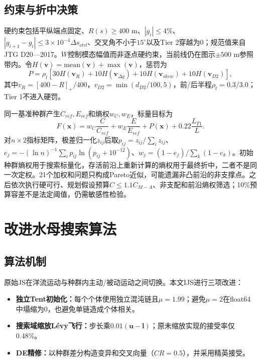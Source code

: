 \documentclass[preprint,12pt]{elsarticle}
\begin{document}
\subsection{约束与折中决策}

硬约束包括平纵端点固定、$R(s)\geq400$ m、$|g_i|\leq4\%$、$|g_{i+1}-g_i|\leq3\times10^{-4}\Delta s_{ctrl}$、交叉角不小于$15^\circ$以及Tier 2穿越为0；规范值来自JTG D20—2017\cite{jtgd20}。$W$控制模态幅值而非逐点硬约束，当前线仍在图示$\pm500$ m参照带内。令$H(\bm v)=\mathrm{mean}(\bm v)+\max(\bm v)$，惩罚为
\begin{equation}
P=\rho_t[30H(\bm v_R)+10H(\bm v_{\Delta g})+10H(\bm v_{skew})+10H(\bm v_{D2})],
\end{equation}
其中$v_R=[400-R]_+/400$，$v_{D2}=\min(d_{D2}/100,5)$，前/后半程$\rho_t=0.3/3.0$；Tier 1不进入硬罚。

同一基准种群产生$C_{ref},E_{ref}$和熵权$w_C,w_E$，标量目标为
\begin{equation}
F(\bm x)=w_C\frac{C}{C_{ref}}+w_E\frac{E}{E_{ref}}+P(\bm x)
+0.22\frac{L_{T1}}{L}.
\end{equation}
对$n\times2$指标矩阵，极差归一化$z_{ij}$后取$p_{ij}=z_{ij}/\sum_i z_{ij}$、$e_j=-(\ln n)^{-1}\sum_i p_{ij}\ln(p_{ij}+10^{-12})$、$w_j=(1-e_j)/\sum_k(1-e_k)$。初始种群熵权用于搜索标量化，存活前沿上重新计算的熵权用于最终折中，二者不是同一次定权。21个加权和问题只构成Pareto近似，可能遗漏非凸前沿的非支撑点。之后依次执行硬可行、规划假设预算$C\leq1.1C_{M-A}$、非支配和前沿熵权筛选；10\%预算容差不是法定阈值，仍需敏感性检验。

\section{改进水母搜索算法}

\subsection{算法机制}

原始JS在洋流运动与种群内主动/被动运动之间切换\cite{chou2021}。本文IJS进行三项改进：
\begin{itemize}[leftmargin=*]
\item \textbf{独立Tent初始化：}每个个体使用独立混沌链且$\mu=1.99$；避免$\mu=2$在float64中塌缩为0，也避免单链造成个体相关。
\item \textbf{搜索域缩放L\'evy飞行：}步长乘$0.01(\bm u-\bm l)$；原未缩放实现的接受率仅0.48\%。
\item \textbf{DE精修：}以种群差分构造变异和交叉向量（$CR=0.5$），并采用精英接受\cite{storn1997}。
\end{itemize}
\end{document}
